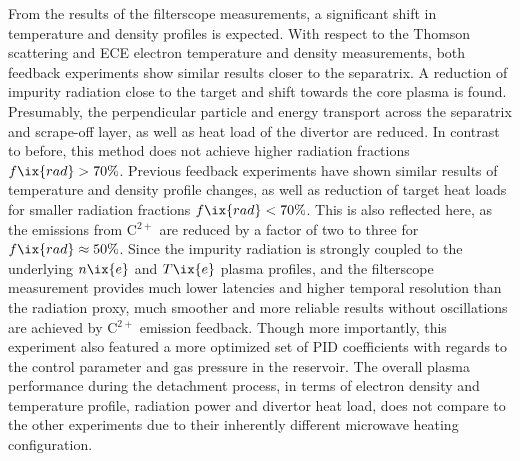                 From the results of the filterscope measurements, a significant shift in temperature and density profiles is expected. With respect to the Thomson scattering and ECE electron temperature and density measurements, both feedback experiments show similar results closer to the separatrix. A reduction of impurity radiation close to the target and shift towards the core plasma is found. Presumably, the perpendicular particle and energy transport across the separatrix and scrape-off layer, as well as heat load of the divertor are reduced. In contrast to before, this method does not achieve higher radiation fractions $f\ix{rad}>70\%$. Previous feedback experiments have shown similar results of temperature and density profile changes, as well as reduction of target heat loads for smaller radiation fractions $f\ix{rad}<70\%$. This is also reflected here, as the emissions from C$^{2+}$ are reduced by a factor of two to three for $f\ix{rad}\approx50\%$. Since the impurity radiation is strongly coupled to the underlying $n\ix{e}$ and $T\ix{e}$ plasma profiles, and the filterscope measurement provides much lower latencies and higher temporal resolution than the radiation proxy, much smoother and more reliable results without oscillations are achieved by C$^{2+}$ emission feedback. Though more importantly, this experiment also featured a more optimized set of PID coefficients with regards to the control parameter and gas pressure in the reservoir. The overall plasma performance during the detachment process, in terms of electron density and temperature profile, radiation power and divertor heat load, does not compare to the other experiments due to their inherently different microwave heating configuration\cite{Erckmann2007}.%
%
